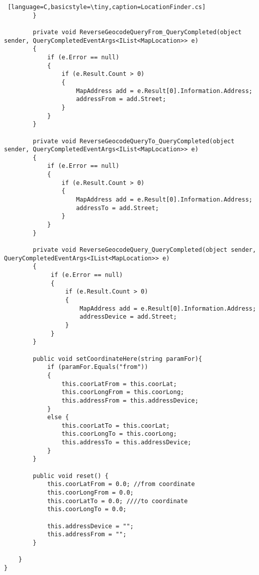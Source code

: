 \begin{lstlisting} [language=C,basicstyle=\tiny,caption=LocationFinder.cs]
        }

        private void ReverseGeocodeQueryFrom_QueryCompleted(object sender, QueryCompletedEventArgs<IList<MapLocation>> e)
        {
            if (e.Error == null)
            {
                if (e.Result.Count > 0)
                {
                    MapAddress add = e.Result[0].Information.Address;
                    addressFrom = add.Street;
                }
            }
        }

        private void ReverseGeocodeQueryTo_QueryCompleted(object sender, QueryCompletedEventArgs<IList<MapLocation>> e)
        {
            if (e.Error == null)
            {
                if (e.Result.Count > 0)
                {
                    MapAddress add = e.Result[0].Information.Address;
                    addressTo = add.Street;
                }
            }
        }

        private void ReverseGeocodeQuery_QueryCompleted(object sender, QueryCompletedEventArgs<IList<MapLocation>> e)
        {
             if (e.Error == null)
             {
                 if (e.Result.Count > 0)
                 {
                     MapAddress add = e.Result[0].Information.Address;
                     addressDevice = add.Street;
                 } 
             }
        } 

        public void setCoordinateHere(string paramFor){
            if (paramFor.Equals("from"))
            {
                this.coorLatFrom = this.coorLat;
                this.coorLongFrom = this.coorLong;
                this.addressFrom = this.addressDevice;
            }
            else {
                this.coorLatTo = this.coorLat;
                this.coorLongTo = this.coorLong;
                this.addressTo = this.addressDevice;
            }
        }

        public void reset() { 
            this.coorLatFrom = 0.0; //from coordinate
            this.coorLongFrom = 0.0;
            this.coorLatTo = 0.0; ////to coordinate
            this.coorLongTo = 0.0;

            this.addressDevice = "";
            this.addressFrom = "";
        }
 
    }
}
\end{lstlisting}